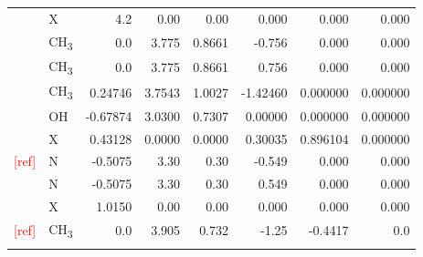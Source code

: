 \begin{table}[h]
\begin{centering}
\begin{tabular*}{1\linewidth}{@{\extracolsep{\fill}}llrrrrrr}
\addlinespace[-0.17em]
\addlinespace[-0.33em]
 & {\scriptsize{}X} & {\scriptsize{}4.2} & {\scriptsize{}0.00} & {\scriptsize{}0.00} & {\scriptsize{}0.000} & {\scriptsize{}0.000 } & {\scriptsize{}0.000 }\tabularnewline
\addlinespace[-0.17em]
\midrule 
\addlinespace[-0.33em]
{\scriptsize{}Ethane \citep{jorgensen_relative_1990}} & {\scriptsize{}CH\textsubscript{3}} & {\scriptsize{}0.0} & {\scriptsize{}3.775} & {\scriptsize{}0.8661} & {\scriptsize{}-0.756} & {\scriptsize{}0.000} & {\scriptsize{}0.000}\tabularnewline
\addlinespace[-0.17em]
\addlinespace[-0.33em]
 & {\scriptsize{}CH\textsubscript{3}} & {\scriptsize{}0.0} & {\scriptsize{}3.775} & {\scriptsize{}0.8661} & {\scriptsize{}0.756} & {\scriptsize{}0.000} & {\scriptsize{}0.000}\tabularnewline
\addlinespace[-0.17em]
\midrule 
\addlinespace[-0.33em]
{\scriptsize{}Methanol \citep{Schnabel_2007}} & {\scriptsize{}CH\textsubscript{3}} & {\scriptsize{}0.24746} & {\scriptsize{}3.7543} & {\scriptsize{}1.0027} & {\scriptsize{}-1.42460} & {\scriptsize{}0.000000} & {\scriptsize{}0.000000}\tabularnewline
\addlinespace[-0.17em]
\addlinespace[-0.33em]
 & {\scriptsize{}OH} & {\scriptsize{}-0.67874} & {\scriptsize{}3.0300} & {\scriptsize{}0.7307} & {\scriptsize{}0.00000} & {\scriptsize{}0.000000} & {\scriptsize{}0.000000}\tabularnewline
\addlinespace[-0.17em]
\addlinespace[-0.33em]
 & {\scriptsize{}X} & {\scriptsize{}0.43128} & {\scriptsize{}0.0000} & {\scriptsize{}0.0000} & {\scriptsize{}0.30035} & {\scriptsize{}0.896104} & {\scriptsize{}0.000000}\tabularnewline
\addlinespace[-0.17em]
\midrule 
\addlinespace[-0.33em]
{\scriptsize{}$\mathrm{N_{2}}$ }\textcolor{red}{\scriptsize{}{[}ref{]}} & {\scriptsize{}N} & {\scriptsize{}-0.5075} & {\scriptsize{}3.30} & {\scriptsize{}0.30} & {\scriptsize{}-0.549} & {\scriptsize{}0.000} & {\scriptsize{}0.000}\tabularnewline
\addlinespace[-0.17em]
\addlinespace[-0.33em]
 & {\scriptsize{}N} & {\scriptsize{}-0.5075} & {\scriptsize{}3.30} & {\scriptsize{}0.30} & {\scriptsize{}0.549} & {\scriptsize{}0.000} & {\scriptsize{}0.000}\tabularnewline
\addlinespace[-0.17em]
\addlinespace[-0.33em]
 & {\scriptsize{}X} & {\scriptsize{}1.0150} & {\scriptsize{}0.00} & {\scriptsize{}0.00} & {\scriptsize{}0.000} & {\scriptsize{}0.000} & {\scriptsize{}0.000}\tabularnewline
\addlinespace[-0.17em]
\midrule 
\addlinespace[-0.33em]
{\scriptsize{}Propane }\textcolor{red}{\scriptsize{}{[}ref{]}} & {\scriptsize{}CH\textsubscript{3}} & {\scriptsize{}0.0} & {\scriptsize{}3.905} & {\scriptsize{}0.732} & {\scriptsize{}-1.25} & {\scriptsize{}-0.4417} & {\scriptsize{}0.0}\tabularnewline
\addlinespace[-0.17em]
\addlinespace[-0.33em]

\end{tabular*}
\end{centering}
\end{table}
